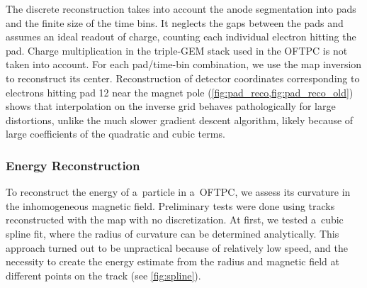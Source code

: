 		The discrete reconstruction takes into account the anode segmentation into pads and the finite size of the time bins. It neglects the gaps between the pads and assumes an ideal readout of charge, counting each individual electron hitting the pad. Charge multiplication in the triple-\ac{GEM} stack used in the \ac{OFTPC} is not taken into account. For each pad/time-bin combination, we use the map inversion to reconstruct its center. Reconstruction of detector coordinates corresponding to electrons hitting pad 12 near the magnet pole (\cref{fig:pad_reco,fig:pad_reco_old}) shows that interpolation on the inverse grid behaves pathologically for large distortions, unlike the much slower gradient descent algorithm, likely because of large coefficients of the quadratic and cubic terms.
		
	\subsubsection*{Energy Reconstruction}
		To reconstruct the energy of a~particle in a~\ac{OFTPC}, we assess its curvature in the inhomogeneous magnetic field. Preliminary tests were done using tracks reconstructed with the map with no discretization. At first, we tested a~cubic spline fit, where the radius of curvature can be determined analytically. This approach turned out to be unpractical because of relatively low speed, and the necessity to create the energy estimate from the radius and magnetic field at different points on the track (see \cref{fig:spline}).
		

